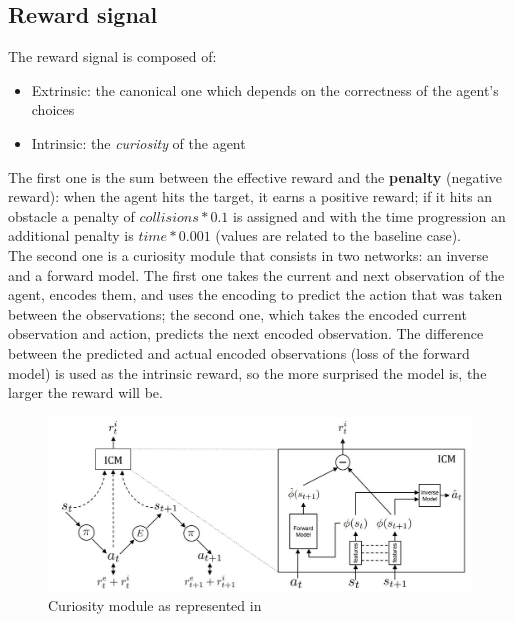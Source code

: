 \documentclass{ifacconf}
\begin{document}
\subsection{Reward signal} %
The reward signal is composed of:
\begin{itemize}
    \item Extrinsic: the canonical one which depends on the correctness of the agent's choices
    \item Intrinsic: the \emph{curiosity} of the agent
\end{itemize}
The first one is the sum between the effective reward and the \textbf{penalty} (negative reward): when the agent hits the target, it earns a positive reward; if it hits an obstacle a penalty of $collisions*0.1$ is assigned and with the time progression an additional penalty is $time*0.001$ (values are related to the baseline case).\\
The second one is a curiosity module that consists in two networks: an inverse and a forward model. The first one takes the current and next observation of the agent, encodes them, and uses the encoding to predict the action that was taken between the observations; the second one, which takes the encoded current observation and action, predicts the next encoded observation. The difference between the predicted and actual encoded observations (loss of the forward model) is used as the intrinsic reward, so the more surprised the model is, the larger the reward will be. \citep{curiosity}

\begin{figure}[!ht]
\begin{center}
\includegraphics[width=\linewidth]{res/curiosity.JPG} 
\caption{Curiosity module as represented in \citep{curiosity}} 
\label{fig:curiosity}
\end{center}
\end{figure}
\end{document}
